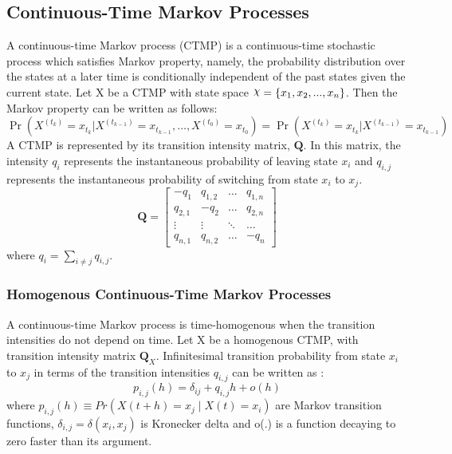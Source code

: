 \subsection{Continuous-Time Markov Processes}
A continuous-time Markov process (CTMP) is a continuous-time stochastic process which satisfies Markov property, namely, the probability distribution over the states at a later time is conditionally independent of the past states given the current state.\cite{Cohn2010a} Let X be a CTMP with state space $ \rchi = \left\lbrace x_{1}, x_{2}, ..., x_{n} \right\rbrace  $. Then the Markov property can be written as follows:
\begin{equation}
	\operatorname{Pr}\left(X^{\left(t_{k}\right)}=x_{t_{k}} | X^{\left(t_{k-1}\right)}=x_{t_{k-1}}, \ldots, X^{\left(t_{0}\right)}=x_{t_{0}}\right)=\operatorname{Pr}\left(X^{\left(t_{k}\right)}=x_{t_{k}} | X^{\left(t_{k-1}\right)}=x_{t_{k-1}}\right)
\end{equation}
A CTMP is represented by its transition intensity matrix, $ \textbf{Q} $. In this matrix, the intensity $ q_{i} $ represents the instantaneous probability of leaving state $ x_{i} $ and $ q_{i,j} $ represents the instantaneous probability of switching from state $ x_{i} $ to $ x_{j} $. 
\begin{equation}
	\textbf{Q} = 
	\begin{bmatrix}
	-q_{1} & q_{1,2} & 	{\hdots}  & q_{1,n} \\
	q_{2,1} & -q_{2} & 	{\hdots}  & q_{2,n}  \\
	{\vdots}  & 	{\vdots}  & 	{\ddots}  & {\hdots}  \\
	q_{n,1} &  q_{n,2} &  {\hdots} & -q_{n}
	\end{bmatrix}
\label{eq:Q_matrix}
\end{equation}
where $ q_{i} = \sum_{i \neq j} q_{i,j}$.\cite{Nodelman1995}

\subsubsection{Homogenous Continuous-Time Markov Processes}
A continuous-time Markov process is time-homogenous when the transition intensities do not depend on time. Let X be a homogenous CTMP, with transition intensity matrix $ \textbf{Q}_X $. Infinitesimal transition probability from state $ x_{i} $ to $ x_{j} $ in terms of the transition intensities $ q_{i,j} $ can be written as \cite{Cohn2010a}:
\begin{equation}
p_{i,j}(h)=\delta_{ij}+q_{i,j} h+o(h)
\label{eq:Markov_trans_func}
\end{equation}
where $ p_{i, j}(h) \equiv Pr(X(t+h)=x_j\mid X(t)=x_i) $ are Markov transition functions, $ \delta_{i,j} = \delta(x_i,x_j)$ is Kronecker delta and o(.) is a function decaying to zero faster than its argument.

